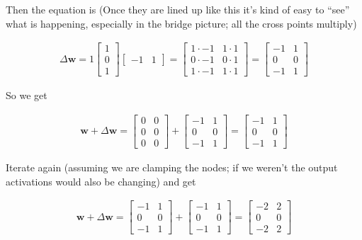 Then the equation is (Once they are lined up like this it's kind of easy to ``see'' what is happening, especially in the bridge picture; all the cross points multiply)

\begin{align*}
\Delta \mathbf{w}  = 1
\begin{bmatrix} 1 \\ 0 \\ 1 \end{bmatrix} 
\begin{bmatrix} -1 & 1 \end{bmatrix} 
= \begin{bmatrix} 1 \cdot -1 & 1 \cdot 1 \\ 0 \cdot -1 & 0 \cdot 1 \\ 1 \cdot -1 & 1 \cdot 1 \end{bmatrix} 
= \begin{bmatrix} -1 & 1 \\ 0 & 0 \\  -1 & 1  \end{bmatrix}
\end{align*}

So we get

\begin{align*}
\mathbf{w} + \Delta \mathbf{w}  =
\begin{bmatrix} 0 & 0 \\ 0 & 0 \\  0  & 0  \end{bmatrix} +
\begin{bmatrix} -1 & 1 \\ 0 & 0 \\  -1 & 1  \end{bmatrix} =
\begin{bmatrix} -1 & 1 \\ 0 & 0 \\  -1 & 1  \end{bmatrix}
\end{align*}

Iterate again (assuming we are clamping the nodes; if we weren't the output activations would also be changing) and get


\begin{align*}
\mathbf{w} + \Delta \mathbf{w}  =
\begin{bmatrix} -1 & 1 \\ 0 & 0 \\  -1 & 1  \end{bmatrix} +
\begin{bmatrix} -1 & 1 \\ 0 & 0 \\  -1 & 1  \end{bmatrix} =
\begin{bmatrix} -2 & 2 \\ 0 & 0 \\  -2 & 2  \end{bmatrix}
\end{align*}

